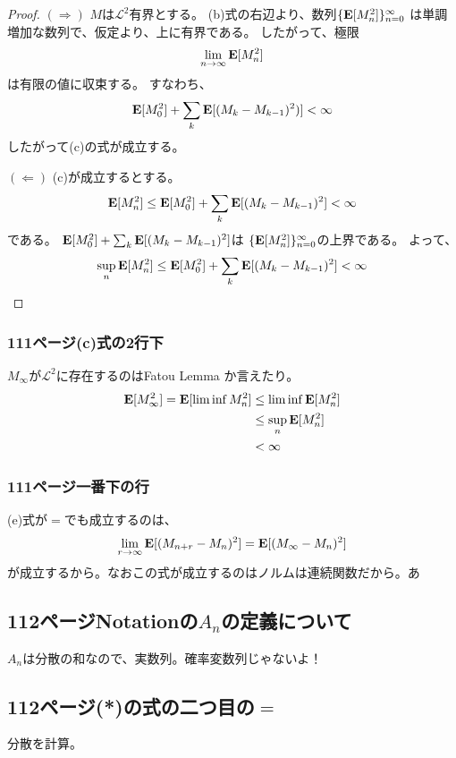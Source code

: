       \begin{proof}
        $(\Rightarrow)$
        $M$は$\mathcal{L}^2$有界とする。
        (b)式の右辺より、数列$\{{\mathbf{E}}[M_n^2]\}_{n = 0}^{\infty}$
        は単調増加な数列で、仮定より、上に有界である。
        したがって、極限
        \[
          \lim_{n \to \infty}{\mathbf{E}}[M_n^2]
        \]
        は有限の値に収束する。
        すなわち、
        \[
          {\mathbf{E}}[M_0^2] + \sum_k {\mathbf{E}}[(M_k - M_{k-1})^2)] < \infty
        \]
        したがって(c)の式が成立する。

        $(\Leftarrow)$
        (c)が成立するとする。
        \[
          {\mathbf{E}}[M_n^2] \leq {\mathbf{E}}[M_0^2] + \sum_k {\mathbf{E}}[(M_k - M_{k-1})^2] < \infty
        \]
        である。
        ${\mathbf{E}}[M_0^2] + \sum_k {\mathbf{E}}[(M_k - M_{k-1})^2]$は
        $\{{\mathbf{E}}[M_n^2]\}_{n = 0}^{\infty}$の上界である。
        よって、
        \[
          \sup_{n} {\mathbf{E}}[M_n^2] \leq {\mathbf{E}}[M_0^2] + \sum_k {\mathbf{E}}[(M_k - M_{k-1})^2] < \infty
        \]
      \end{proof}

    \subsubsection{111ページ(c)式の2行下}
      $M_{\infty}$が$\mathcal{L}^2$に存在するのはFatou Lemma か言えたり。
      \begin{align*}
        {\mathbf{E}}[M_{\infty}^2] = {\mathbf{E}}[\liminf M_n^2] &\leq \liminf{\mathbf{E}}[M_n^2]\\
        &\leq \sup_n {\mathbf{E}}[M_n^2]\\
        &< \infty
      \end{align*}

    \subsubsection{111ページ一番下の行}
      (e)式が$=$でも成立するのは、
      \[
        \lim_{r \to \infty} {\mathbf{E}}[(M_{n+r} - M_n)^2] = {\mathbf{E}}[(M_{\infty} - M_n)^2]
      \]
      が成立するから。なおこの式が成立するのはノルムは連続関数だから。あ

  \subsection{112ページNotationの$A_n$の定義について}
    $A_n$は分散の和なので、実数列。確率変数列じゃないよ！
  \subsection{112ページ(*)の式の二つ目の$=$}
    分散を計算。

